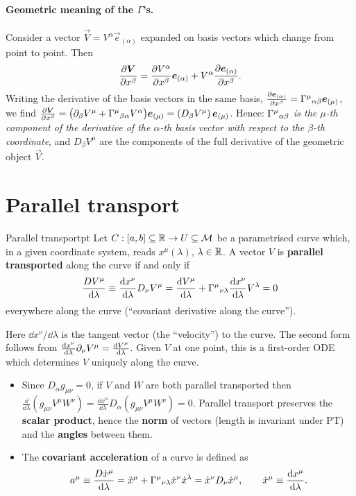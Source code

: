 \paragraph{Geometric meaning of the $\Gamma$'s.} Consider a vector $\vec V=V^\alpha\vec e_{(\alpha)}$ expanded on basis vectors which change from point to point. Then
\[
  \frac{\partial\bm{V}}{\partial x^\beta}=\frac{\partial V^\alpha}{\partial x^\beta}\bm{e}_{(\alpha)}+V^\alpha\frac{\partial\bm{e}_{(\alpha)}}{\partial x^\beta}.
\]
Writing the derivative of the basis vectors in the same basis, $\frac{\partial\bm{e}_{(\alpha)}}{\partial x^\beta}=\Gamma^{\mu}{}_{\alpha\beta}\bm{e}_{(\mu)}$, we find $\frac{\partial\bm{V}}{\partial x^\beta}=\big(\partial_\beta V^\mu+\Gamma^{\mu}{}_{\beta\alpha}V^\alpha\big)\bm{e}_{(\mu)}=(D_\beta V^\mu)\,\bm{e}_{(\mu)}$. Hence: \emph{$\Gamma^{\mu}{}_{\alpha\beta}$ is the $\mu$-th component of the derivative of the $\alpha$-th basis vector with respect to the $\beta$-th coordinate}, and $D_\beta V^\mu$ are the components of the full derivative of the geometric object $\vec V$.

\section{Parallel transport}

\begin{definition}{Parallel transport}{pt}
Let $C:[a,b]\subseteq\mathbb{R}\to U\subseteq\mathcal{M}$ be a parametrised curve which, in a given coordinate system, reads $x^\mu(\lambda)$, $\lambda\in\mathbb{R}$. A vector $V$ is \textbf{parallel transported} along the curve if and only if
\begin{equation}
  \frac{DV^\mu}{\mathrm{d}\lambda}\equiv\frac{\mathrm{d} x^\nu}{\mathrm{d}\lambda}D_\nu V^\mu=\frac{\mathrm{d} V^\mu}{\mathrm{d}\lambda}+\Gamma^{\mu}{}_{\nu\lambda}\frac{\mathrm{d} x^\nu}{\mathrm{d}\lambda}V^\lambda=0
\end{equation}
everywhere along the curve (``covariant derivative along the curve'').
\end{definition}
Here $\dd x^\nu/\dd\lambda$ is the tangent vector (the ``velocity'') to the curve. The second form follows from $\frac{\mathrm{d} x^\nu}{\mathrm{d}\lambda}\partial_\nu V^\mu=\frac{\mathrm{d} V^\mu}{\mathrm{d}\lambda}$. Given $V$ at one point, this is a first-order ODE which determines $V$ uniquely along the curve.

\begin{remarkbox}[Properties]
\begin{itemize}[nosep]
\item Since $D_\alpha g_{\mu\nu}=0$, if $V$ and $W$ are both parallel transported then
$\frac{\dd}{\dd\lambda}(g_{\mu\nu}V^\mu W^\nu)=\frac{\dd x^\alpha}{\dd\lambda}D_\alpha(g_{\mu\nu}V^\mu W^\nu)=0$. Parallel transport preserves the \textbf{scalar product}, hence the \textbf{norm} of vectors (length is invariant under PT) and the \textbf{angles} between them.
\item The \textbf{covariant acceleration} of a curve is defined as
\begin{equation}
  a^\mu\equiv\frac{D\dot x^\mu}{\mathrm{d}\lambda}=\ddot x^\mu+\Gamma^{\mu}{}_{\nu\lambda}\dot x^\nu\dot x^\lambda=\dot x^\nu D_\nu\dot x^\mu,\qquad \dot x^\mu\equiv\frac{\mathrm{d} x^\mu}{\mathrm{d}\lambda}.
\end{equation}
\end{itemize}
\end{remarkbox}

